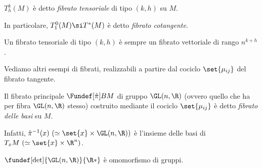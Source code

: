 \begin{defn}
	$T_h^k(M)$ è detto \emph{fibrato tensoriale} di tipo $(k, h)$ su $M$.
	
	In particolare, $T_1^0(M) \si T \dual (M)$ è detto \emph{fibrato cotangente}.
\end{defn}

\begin{oss}
	Un fibrato tensoriale di tipo $(k, h)$ è sempre un fibrato vettoriale di rango $n^{k+h}$.
\end{oss}

Vediamo altri esempi di fibrati, realizzabili a partire dal cociclo $\set{\mu_{ij}}$ del fibrato tangente.

\begin{defn}
	Il fibrato principale $\Fundef[\hat{\pi}]{B}{M}$ di gruppo $\GL(n, \R)$ (ovvero quello che ha per fibra $\GL(n, \R)$ stesso) costruito mediante il cociclo $\set{\mu_{ij}}$ è detto \emph{fibrato delle basi} su $M$.
	
	Infatti, $\hat{\pi}^{-1}(x)  \ (\simeq \set{x} \times \GL(n, \R) )$ è l'insieme delle basi di $T_x M \ (\simeq \set{x} \times \R^n)$.
\end{defn}

\begin{oss} 
	$ \fundef[\det]{\GL(n, \R)}{\R*} $ è omomorfismo di gruppi.
\end{oss}
